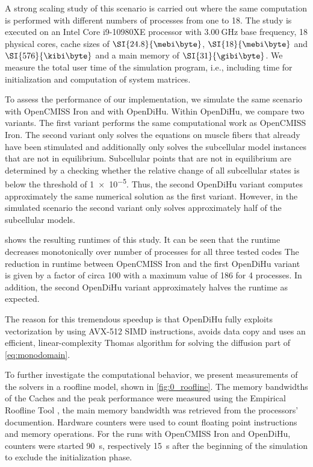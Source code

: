 A strong scaling study of this scenario is carried out where the same computation is performed with different numbers of processes from one to 18. 
The study is executed on an Intel Core i9-10980XE processor with $\SI{3.00}{\giga\hertz}$ base frequency, 18 physical cores, cache sizes of 
$\SI{24.8}{\mebi\byte}$, $\SI{18}{\mebi\byte}$ and $\SI{576}{\kibi\byte}$ and a main memory of $\SI{31}{\gibi\byte}$.
We measure the total user time of the simulation program, i.e., including time for initialization and computation of system matrices.

To assess the performance of our implementation, we simulate the same scenario with OpenCMISS Iron and with OpenDiHu. 
Within OpenDiHu, we compare two variants. 
The first variant performs the same computational work as OpenCMISS Iron. 
The second variant only solves the equations on muscle fibers that already have been stimulated and additionally only solves the subcellular model instances that are not in equilibrium. 
Subcellular points that are not in equilibrium are determined by a checking whether the relative change of all subcellular states is below the threshold of \num{1e-5}. 
Thus, the second OpenDiHu variant computes approximately the same numerical solution as the first variant.
However, in the simulated scenario the second variant only solves approximately half of the subcellular models.

 shows the resulting runtimes of this study. It can be seen that the runtime decreases monotonically  over number of processes for all three tested codes 
The reduction in runtime between OpenCMISS Iron and the first OpenDiHu variant is given by a factor of circa 100 with a maximum value of 186 for 4 processes. In addition, the second OpenDiHu variant approximately halves the runtime as expected.

The reason for this tremendous speedup is that OpenDiHu fully exploits vectorization by using AVX-512 SIMD instructions, avoids data copy and uses an efficient, linear-complexity Thomas algorithm for solving the diffusion part of \cref{eq:monodomain}.

To further investigate the computational behavior, we present measurements of the solvers in a roofline model, shown in \cref{fig:0_roofline}. The memory bandwidths of the Caches and the peak performance were measured using the Empirical Roofline Tool \cite{ert}, the main memory bandwidth was retrieved from the processors' documention.
Hardware counters were used to count floating point instructions and memory operations. 
For the runs with OpenCMISS Iron and OpenDiHu, counters were started \SI{90}{\second}, respectively \SI{15}{\second} after the beginning of the simulation to exclude the initialization phase.

